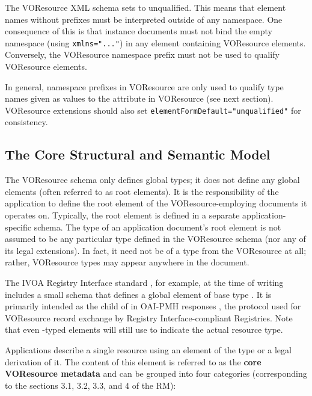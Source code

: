 \documentclass[11pt,a4paper]{ivoa}
\begin{document}
The VOResource XML schema sets  to
unqualified.  This means that element names without prefixes must be
interpreted outside of any namespace.  One consequence of this is that
instance documents must not bind the
empty namespace (using \verb|xmlns="..."|) in any element containing
VOResource elements.  
Conversely, the VOResource namespace prefix must not
be used to qualify VOResource elements.  

In general, namespace prefixes in VOResource are
only used to qualify type names given as values to the 
attribute in VOResource (see next section).  VOResource extensions 
should also set \verb|elementFormDefault="unqualified"| for consistency.



\subsection{The Core Structural and Semantic Model}
\label{sect:core}

The VOResource schema only defines global types; it does not define
any global elements (often referred to as root elements).  It is the
responsibility of the application to define the root element of the
VOResource-employing documents it operates on.  Typically, the root
element is defined in a separate application-specific schema.  The
type of an application document's root element is not assumed to be
any particular type defined in the VOResource schema (nor any of its
legal extensions).  In fact, it need not be of a type from the
VOResource at all; rather, VOResource types may appear anywhere in the
document.   

The IVOA Registry Interface standard \citep{2009ivoa.spec.1104B}, 
for example, at the time of writing includes a small schema that defines
a global element  of base type
.  It is primarily intended as the child of
 in OAI-PMH responses \citep{std:oaipmh}, the protocol
used for VOResource record exchange by Registry Interface-compliant
Registries.  Note that even
-typed elements will still use  to
indicate the actual resource type.

Applications describe a single resource using an element of the type
 or a legal derivation of it.  The content of this
element is referred to as the \textbf{core VOResource
metadata} and can be grouped into four categories (corresponding to the
sections 3.1, 3.2, 3.3, and 4 of the RM):
\end{document}
